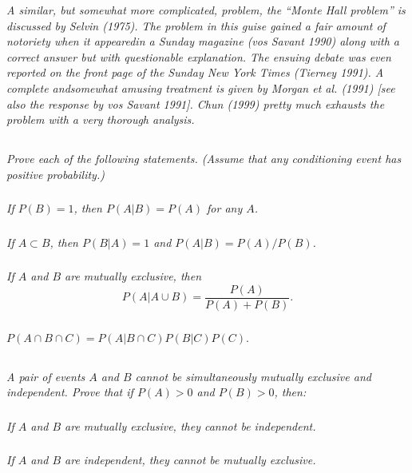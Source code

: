 \documentclass[12pt]{amsart}
\begin{document}
\textit{A similar, but somewhat more complicated, problem, the “Monte Hall problem” is discussed by Selvin (1975). 
	The problem in this guise gained a fair amount of notoriety when it appearedin a Sunday magazine (vos Savant 1990) along with a correct
	answer but with questionable explanation. The ensuing debate was even reported on the front page of the Sunday New York Times (Tierney 1991). 
	A complete andsomewhat amusing treatment is given by Morgan et al. (1991) [see also the response by vos Savant 1991]. 
	Chun (1999) pretty much exhausts the problem with a very thorough analysis.}

\subsection{} %
\textit{Prove each of the following statements. (Assume that any conditioning event has positive probability.)}
	\subsubsection{} \textit{If \(P(B) = 1\), then \(P(A|B) = P(A)\) for any \(A\).}
	\subsubsection{} \textit{If \(A \subset B\), then \(P(B|A) = 1\) and \(P(A|B) = P(A)/P(B)\).}
	\subsubsection{} \textit{If \(A\) and \(B\) are mutually exclusive, then}
		\[ P(A|A\cup B) = \frac{P(A)}{P(A) + P(B)}. \]
	\subsubsection{} \(P(A\cap B\cap C) = P(A|B\cap C) P(B|C) P(C)\).

\subsection{} %
\textit{A pair of events \(A\) and \(B\) cannot be simultaneously mutually exclusive and independent.
	Prove that if \(P(A) > 0\) and \(P(B) > 0\), then:}
	\subsubsection{} \textit{If \(A\) and \(B\) are mutually exclusive, they cannot be independent.}
	\subsubsection{} \textit{If \(A\) and \(B\) are independent, they cannot be mutually exclusive.}
\end{document}
